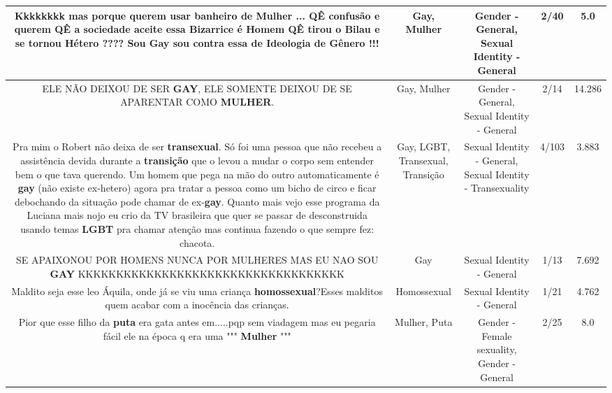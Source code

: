 \documentclass[11pt]{article}
\newlength\mylength
\begin{document}
\begin{center}
\begin{longtable}{|C{.65\mylength}|C{.30\mylength}|C{.12\mylength}|C{.12\mylength}|C{.12\mylength}|}
  \small Kkkkkkkk mas porque querem usar banheiro de \textbf{Mulher} ...   QÊ confusão e querem QÊ a sociedade aceite essa Bizarrice é Homem QÊ tirou o Bilau e se tornou Hétero ???? Sou \textbf{Gay} sou contra essa de Ideologia de Gênero !!!\normalsize   & Gay, Mulher & Gender - General, Sexual Identity - General & 2/40 & 5.0 \\  \hline
  \small ELE NÃO DEIXOU DE SER \textbf{GAY}, ELE SOMENTE DEIXOU DE SE APARENTAR COMO \textbf{MULHER}.\normalsize   & Gay, Mulher & Gender - General, Sexual Identity - General & 2/14 & 14.286 \\  \hline
  \small Pra mim o Robert não deixa de ser \textbf{transexual}. Só foi uma pessoa que não recebeu a assistência devida durante a \textbf{transição} que o levou a mudar o corpo sem entender bem o que tava querendo. Um homem que pega na mão do outro automaticamente é \textbf{gay} (não existe ex-hetero) agora pra tratar a pessoa como um bicho de circo e ficar debochando da situação pode chamar de ex-\textbf{gay}. Quanto mais vejo esse programa da Luciana mais nojo eu crio da TV brasileira que quer se passar de desconstruida usando temas \textbf{LGBT} pra chamar atenção mas continua fazendo o que sempre fez: chacota.\normalsize   & Gay, LGBT, Transexual, Transição & Sexual Identity - General, Sexual Identity - Transexuality & 4/103 & 3.883 \\  \hline
  \small SE APAIXONOU POR HOMENS  NUNCA POR MULHERES MAS EU NAO SOU \textbf{GAY} KKKKKKKKKKKKKKKKKKKKKKKKKKKKKKKKKKK\normalsize   & Gay & Sexual Identity - General & 1/13 & 7.692 \\  \hline
  \small Maldito seja esse leo Áquila, onde já se viu uma criança \textbf{homossexual}?Esses malditos quem acabar com a inocência das crianças.\normalsize   & Homossexual & Sexual Identity - General & 1/21 & 4.762 \\  \hline
  \small Pior que esse filho da \textbf{puta} era gata antes em.....pqp sem viadagem mas eu pegaria fácil ele na época q era uma """ \textbf{Mulher} """\normalsize   & Mulher, Puta & Gender - Female sexuality, Gender - General & 2/25 & 8.0 \\  \hline

\end{longtable}
\end{center}
\end{document}
